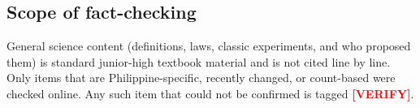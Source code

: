 \subsection*{Scope of fact-checking}
General science content (definitions, laws, classic experiments, and who proposed them) is standard junior-high textbook material and is not cited line by line. Only items that are Philippine-specific, recently changed, or count-based were checked online. Any such item that could not be confirmed is tagged \textcolor{red}{\textbf{[VERIFY]}}.
